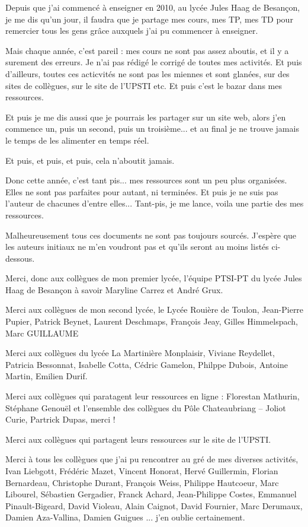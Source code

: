 Depuis que j'ai commencé à enseigner en 2010, au lycée Jules Haag de Besançon, je me dis qu'un jour, il faudra que je partage mes cours, mes TP, mes TD pour remercier tous les gens grâce auxquels j'ai pu commencer à enseigner. 

Mais chaque année, c'est pareil : mes cours ne sont pas assez aboutis, et il y a surement des erreurs. Je n'ai pas rédigé le corrigé de toutes mes activités. Et puis d'ailleurs, toutes ces acticvités ne sont pas les miennes et sont glanées, sur des sites de collègues, sur le site de l'UPSTI etc. Et puis c'est le bazar dans mes ressources. 

Et puis je me dis aussi que je pourrais les partager sur un site web, alors j'en commence un, puis un second, puis un troisième... et au final je ne trouve jamais le temps de les alimenter en temps réel. 

Et puis, et puis, et puis, cela n'aboutit jamais. 

Donc cette année, c'est tant pis... mes ressources sont un peu plus organisées. Elles ne sont pas parfaites pour autant, ni terminées. Et puis je ne suis pas l'auteur de chacunes d'entre elles... Tant-pis, je me lance, voila une partie des mes ressources.

Malheureusement tous ces documents ne sont pas toujours sourcés. J'espère que les auteurs initiaux ne m'en voudront pas et qu'ils seront au moins listés ci-dessous. 

Merci, donc aux collègues de mon premier lycée, l'équipe PTSI-PT du lycée Jules Haag de Besançon à savoir Maryline Carrez et André Grux. 

Merci aux collègues de mon second lycée, le Lycée Rouière de Toulon, Jean-Pierre Pupier, Patrick Beynet, Laurent Deschmaps, François Jeay, Gilles Himmelspach, Marc GUILLAUME

Merci aux collègues du lycée La Martinière Monplaisir, Viviane Reydellet, Patricia Bessonnat, Isabelle Cotta, Cédric Gamelon, Philppe Dubois, Antoine Martin, Emilien Durif.

Merci aux collègues qui paratagent leur ressources en ligne : Florestan Mathurin, Stéphane Genouël et l'ensemble des collègues du Pôle Chateaubriang -- Joliot Curie, Partrick Dupas, merci !

Merci aux collègues qui partagent leurs ressources sur le site de l'UPSTI.

Merci à tous les collègues que j'ai pu rencontrer au gré de mes diverses activités, Ivan Liebgott, Frédéric Mazet, Vincent Honorat, Hervé Guillermin, Florian Bernardeau, Christophe Durant, François Weiss, Philippe Hautcoeur, Marc Libourel, Sébastien Gergadier, Franck Achard, Jean-Philippe Costes, Emmanuel Pinault-Bigeard, David Violeau, Alain Caignot, David Fournier, Marc Derumaux, Damien Aza-Vallina, Damien Guigues ... j'en oublie certainement. 

